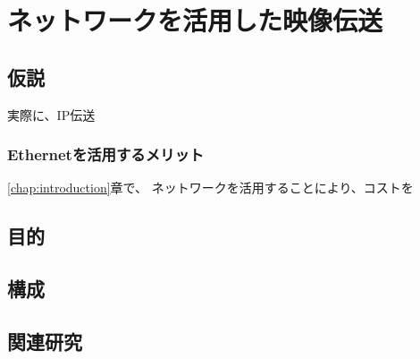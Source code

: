 \chapter{ネットワークを活用した映像伝送}
\label{chap:network-transmission}

\section{仮説}
実際に、IP伝送

\subsection{Ethernetを活用するメリット}

\ref{chap:introduction}章で、
ネットワークを活用することにより、コストを

\section{目的}


\section{構成}

\section{関連研究}
